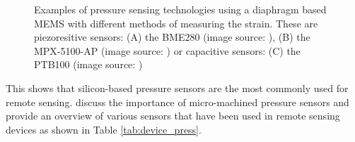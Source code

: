 \begin{figure}[H]
	\centering
	\begin{subfigure}[b]{0.3\textwidth}
	\end{subfigure}%
	\hfill
	\begin{subfigure}[b]{0.3\textwidth}
	\end{subfigure}%
	\hfill
	\begin{subfigure}[b]{0.3\textwidth}
	\end{subfigure}%
	\hfill
	\caption{Examples of pressure sensing technologies using a diaphragm based MEMS with different methods of measuring the strain. These are piezoresitive sensors: (A) the BME280 (image source: \cite{BME280}), (B) the MPX-5100-AP (image source: \cite{MPX5100AP}) or  capacitive sensors: (C) the PTB100 (image source: \cite{PTB110}) } 
	\label{fig:press_examples}
\end{figure}


This shows that silicon-based pressure sensors are the most commonly used for remote sensing. \textcite{eaton1997micromachined} discuss the importance of micro-machined pressure sensors and provide an overview of various sensors that have been used in remote sensing devices as shown in Table \ref{tab:device_press}.

